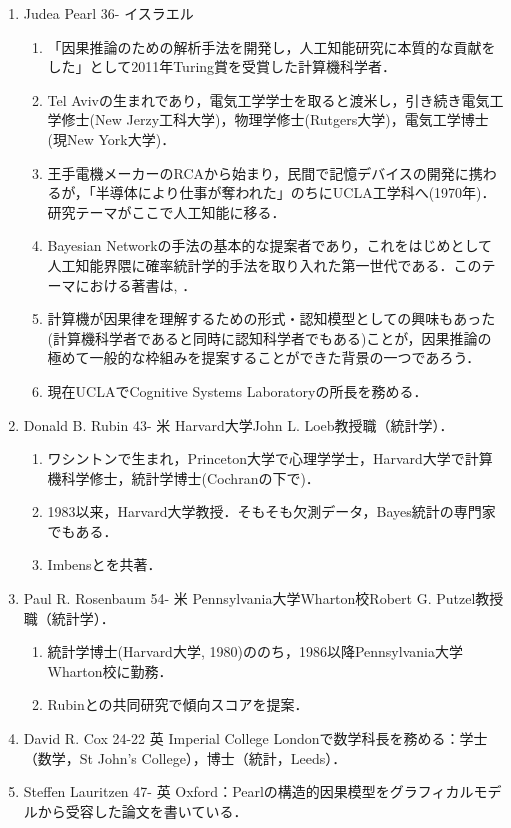 \documentclass[uplatex,dvipdfmx]{jsreport}
\begin{document}
\begin{history}[主な研究者]\mbox{}
    \begin{enumerate}
        \item Judea Pearl 36- イスラエル 
        \begin{enumerate}
            \item 「因果推論のための解析手法を開発し，人工知能研究に本質的な貢献をした」として2011年Turing賞を受賞した計算機科学者．
            \item Tel Avivの生まれであり，電気工学学士を取ると渡米し，引き続き電気工学修士(New Jerzy工科大学)，物理学修士(Rutgers大学)，電気工学博士(現New York大学)．
            \item 王手電機メーカーのRCAから始まり，民間で記憶デバイスの開発に携わるが，「半導体により仕事が奪われた」のちにUCLA工学科へ(1970年)．研究テーマがここで人工知能に移る．
            \item Bayesian Networkの手法の基本的な提案者であり，これをはじめとして人工知能界隈に確率統計学的手法を取り入れた第一世代である．このテーマにおける著書は\cite{Pearl84-Heuristics}, \cite{Pearl88-IntelligentSystem}．
            \item 計算機が因果律を理解するための形式・認知模型としての興味もあった(計算機科学者であると同時に認知科学者でもある)ことが，因果推論の極めて一般的な枠組みを提案することができた背景の一つであろう．
            \item 現在UCLAでCognitive Systems Laboratoryの所長を務める．
        \end{enumerate}
        \item Donald B. Rubin 43- 米 Harvard大学John L. Loeb教授職（統計学）．
        \begin{enumerate}
            \item ワシントンで生まれ，Princeton大学で心理学学士，Harvard大学で計算機科学修士，統計学博士(Cochranの下で)．
            \item 1983以来，Harvard大学教授．そもそも欠測データ\cite{Little-Rubin19-MissingData}，Bayes統計\cite{BDA}の専門家でもある．
            \item Imbensと\cite{Imbens-Rubin15}を共著．
        \end{enumerate}
        \item Paul R. Rosenbaum 54- 米 Pennsylvania大学Wharton校Robert G. Putzel教授職（統計学）．
        \begin{enumerate}
            \item 統計学博士(Harvard大学, 1980)ののち，1986以降Pennsylvania大学Wharton校に勤務．
            \item Rubinとの共同研究\cite{Rosenbaum-Rubin83-PropensityScore}で傾向スコアを提案．
        \end{enumerate}
        \item David R. Cox 24-22 英 Imperial College Londonで数学科長を務める：学士（数学，St John's College），博士（統計，Leeds）．
        \item Steffen Lauritzen 47- 英 Oxford：Pearlの構造的因果模型をグラフィカルモデルから受容した論文\cite{Lauritzen00-Graphical}を書いている．
    \end{enumerate}
\end{history}
\end{document}
